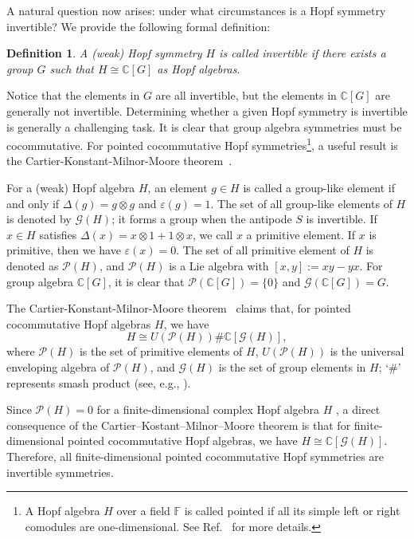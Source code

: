 \documentclass[a4paper,11pt]{article}
\theoremstyle{theorem}
\newtheorem{definition}{Definition}
\theoremstyle{remark}
\newcommand{\Cbb}{\mathbb{C}}
\begin{document}
A natural question now arises: under what circumstances is a Hopf symmetry invertible? We provide the following formal definition:

\begin{definition}
    A (weak) Hopf symmetry $H$ is called \emph{invertible} if there exists a group $G$ such that $H \cong \Cbb[G]$ as Hopf algebras.
\end{definition}

Notice that the elements in \(G\) are all invertible, but the elements in \(\mathbb{C}[G]\) are generally not invertible.  
Determining whether a given Hopf symmetry is invertible is generally a challenging task. It is clear that group algebra symmetries must be cocommutative.  
For pointed cocommutative Hopf symmetries\footnote{A Hopf algebra \(H\) over a field \(\mathbb{F}\) is called pointed if all its simple left or right comodules are one-dimensional. See Ref.~\cite{andruskiewitsch2010classification} for more details.}, a useful result is the Cartier-Konstant-Milnor-Moore theorem~\cite{milnor1965structure,cartier1962groupes,sweedler1969hopf,etingof2016tensor}.


For a (weak) Hopf algebra \( H \), an element \( g \in H \) is called a group-like element if and only if \( \Delta(g) = g \otimes g \) and \( \varepsilon(g) = 1 \). The set of all group-like elements of \( H \) is denoted by \( \mathcal{G}(H) \); it forms a group when the antipode \( S \) is invertible. If $x\in H$ satisfies $\Delta(x)=x\otimes 1+1\otimes x$, we call $x$ a primitive element. If $x$ is primitive, then we have $\varepsilon(x)=0$. The set of all primitive element of $H$ is denoted as $\mathcal{P}(H)$, and  $\mathcal{P}(H)$ is a Lie algebra with $[x,y]:=xy-yx$. For group algebra $\Cbb[G]$, it is clear that $\mathcal{P}(\Cbb[G])=\{0\}$ and $\mathcal{G}(\Cbb[G])=G$.


The Cartier-Konstant-Milnor-Moore theorem~\cite{milnor1965structure,cartier1962groupes,sweedler1969hopf,etingof2016tensor} claims that, for pointed cocommutative Hopf algebras $H$, we have 
   \begin{equation}
       H\cong U(\mathcal{P}(H)) \# \Cbb[\mathcal{G}(H)],
   \end{equation}
   where $\mathcal{P}(H)$ is the set of primitive elements of $H$, $U(\mathcal{P}(H)) $ is the  universal enveloping algebra of $\mathcal{P}(H)$, and $\mathcal{G}(H)$ is the set of group elements in $H$; `\#' represents smash product (see, e.g., \cite{montgomery1993hopf}). 

Since \( \mathcal{P}(H) = 0 \) for a finite-dimensional complex Hopf algebra \( H \) \cite[Exercise 4.2.16]{dascalescu2000hopf}, a direct consequence of the Cartier–Kostant–Milnor–Moore theorem is that for finite-dimensional pointed cocommutative Hopf algebras, we have \( H \cong \mathbb{C}[\mathcal{G}(H)] \). Therefore, all finite-dimensional  pointed cocommutative Hopf symmetries are invertible symmetries.
\end{document}
